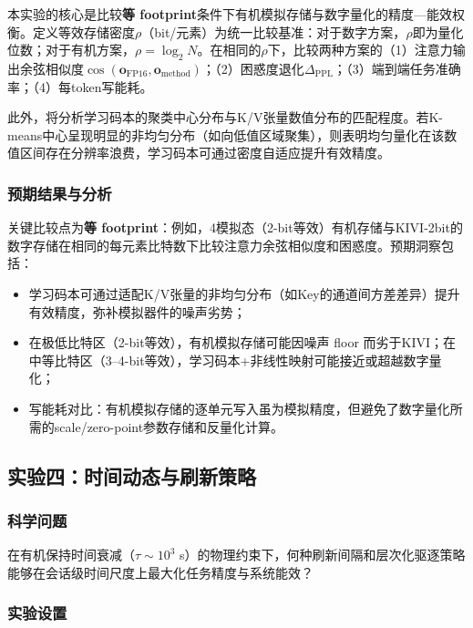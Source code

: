 本实验的核心是比较\textbf{等 footprint}条件下有机模拟存储与数字量化的精度—能效权衡。定义等效存储密度$\rho$（bit/元素）为统一比较基准：对于数字方案，$\rho$即为量化位数；对于有机方案，$\rho = \log_2 N$。在相同的$\rho$下，比较两种方案的（1）注意力输出余弦相似度$\cos(\mathbf{o}_{\text{FP16}}, \mathbf{o}_{\text{method}})$；（2）困惑度退化$\Delta_{\text{PPL}}$；（3）端到端任务准确率；（4）每token写能耗。

此外，将分析学习码本的聚类中心分布与K/V张量数值分布的匹配程度。若K-means中心呈现明显的非均匀分布（如向低值区域聚集），则表明均匀量化在该数值区间存在分辨率浪费，学习码本可通过密度自适应提升有效精度。

\subsubsection{预期结果与分析}

关键比较点为\textbf{等 footprint}：例如，4模拟态（2-bit等效）有机存储与KIVI-2bit的数字存储在相同的每元素比特数下比较注意力余弦相似度和困惑度。预期洞察包括：

\begin{itemize}
    \item 学习码本可通过适配K/V张量的非均匀分布（如Key的通道间方差差异）提升有效精度，弥补模拟器件的噪声劣势；
    \item 在极低比特区（2-bit等效），有机模拟存储可能因噪声 floor 而劣于KIVI；在中等比特区（3–4-bit等效），学习码本+非线性映射可能接近或超越数字量化；
    \item 写能耗对比：有机模拟存储的逐单元写入虽为模拟精度，但避免了数字量化所需的scale/zero-point参数存储和反量化计算。
\end{itemize}

\subsection{实验四：时间动态与刷新策略}
\label{sec:exp4_temporal}

\subsubsection{科学问题}

在有机保持时间衰减（$\tau \sim 10^3$ s）的物理约束下，何种刷新间隔和层次化驱逐策略能够在会话级时间尺度上最大化任务精度与系统能效？

\subsubsection{实验设置}

